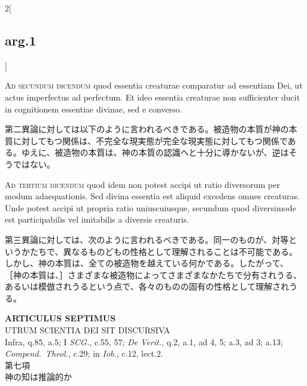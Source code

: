 \documentclass[paper=a4paper,fontsize=10pt,jafontsize=9pt,titlepage]{jlreq}
\begin{document}
\begin{paracol}{2}[\subsection{arg.1}]
\switchcolumn*[\subsection{ad.2}]

{\scshape Ad secundum dicendum} quod essentia creaturae comparatur ad
essentiam Dei, ut actus imperfectus ad perfectum. Et ideo essentia
creaturae non sufficienter ducit in cognitionem essentiae divinae, sed
e converso.

\switchcolumn

第二異論に対しては以下のように言われるべきである。被造物の本質が神の本
質に対してもつ関係は、不完全な現実態が完全な現実態に対してもつ関係であ
る。ゆえに、被造物の本質は、神の本質の認識へと十分に導かないが、逆はそ
うではない。

\switchcolumn*[\subsection{ad.3}]

{\scshape Ad tertium dicendum} quod idem non potest accipi ut ratio
diversorum per modum adaequationis. Sed divina essentia est aliquid
excedens omnes creaturas. Unde potest accipi ut propria ratio
uniuscuiusque, secundum quod diversimode est participabilis vel
imitabilis a diversis creaturis.

\switchcolumn

第三異論に対しては、次のように言われるべきである。同一のものが、対等と
いうかたちで、異なるものどもの性格として理解されることは不可能である。
しかし、神の本質は、全ての被造物を越えている何かである。したがって、
［神の本質は、］さまざまな被造物によってさまざまなかたちで分有されうる、
あるいは模倣されうるという点で、各々のものの固有の性格として理解されう
る。

\end{paracol}


\newpage



{}
\setcounter{section}{7}
\setcounter{subsection}{0}
\begin{center}
{\Large {\bfseries ARTICULUS SEPTIMUS}}\\ {\large UTRUM SCIENTIA DEI SIT
DISCURSIVA}\\ {\footnotesize Infra, q.85, a.5; I {\itshape SCG.},
c.55, 57; {\itshape De Verit.}, q.2, a.1, ad 4, 5; a.3, ad 3;
a.13; {\itshape Compend.~Theol.}, c.29; in {\itshape Iob.}, c.12,
lect.2.}\\ {\Large 第七項\\神の知は推論的か}
\end{center}
\end{document}
